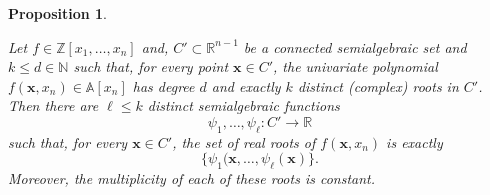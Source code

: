 \documentclass[
]{book}
\newtheorem{proposition}{Proposition}[chapter]
\theoremstyle{definition}
\theoremstyle{definition}
\theoremstyle{definition}
\theoremstyle{definition}
\theoremstyle{remark}
\begin{document}
\begin{proposition}
\protect\hypertarget{prp:coste-polynomial-to-cell}{}\label{prp:coste-polynomial-to-cell}\citep[Proposition 2.16]{coste2000}

Let \(f \in \mathbb{Z}[x_1,\ldots,x_n]\) and, \(C' \subset \mathbb{R}^{n-1}\) be a connected semialgebraic set and \(k \le d \in \mathbb{N}\) such that, for every point \(\mathbf{x} \in C'\), the univariate polynomial \(f(\mathbf{x},x_n) \in \mathbb{A}[x_n]\) has degree \(d\) and exactly \(k\) distinct (complex) roots in \(C'\).
Then there are \(\ell \le k\) distinct semialgebraic functions
\[\psi_1,\ldots,\psi_\ell : C' \to \mathbb{R}
\]
such that, for every \(\mathbf{x} \in C'\), the set of real roots of \(f(\mathbf{x},x_n)\) is exactly
\[\{ \psi_1(\mathbf{x}, \ldots, \psi_\ell(\mathbf{x}) \}.\]
Moreover, the multiplicity of each of these roots is constant.
\end{proposition}
\end{document}
